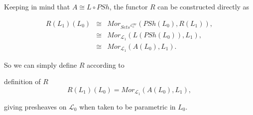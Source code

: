 \begin{frame}
Keeping in mind that $A \cong L \circ PSh$, the functor $R$ can be constructed directly as
\begin{block}{}
\abovedisplayskip=0pt
\begin{eqnarray*}
R(L_1)(L_0) & \cong & Mor_{\textit{Sets}^{\mathcal{L}_0^{opp}}}(PSh( L_0),R(L_1)),\\
		    & \cong & Mor_{\mathcal{L}_1}(L(PSh(L_0)),L_1),\\
   		    & \cong & Mor_{\mathcal{L}_1}(A(L_0),L_1).
\end{eqnarray*}
\end{block}
So we can simply define $R$ according to
\begin{block}{definition of $R$}
$$
R(L_1)(L_0) = Mor_{\mathcal{L}_1}(A(L_0),L_1),
$$
\end{block}
giving presheaves on $\mathcal{L}_0$ when taken to be parametric in $L_0$.
\end{frame}